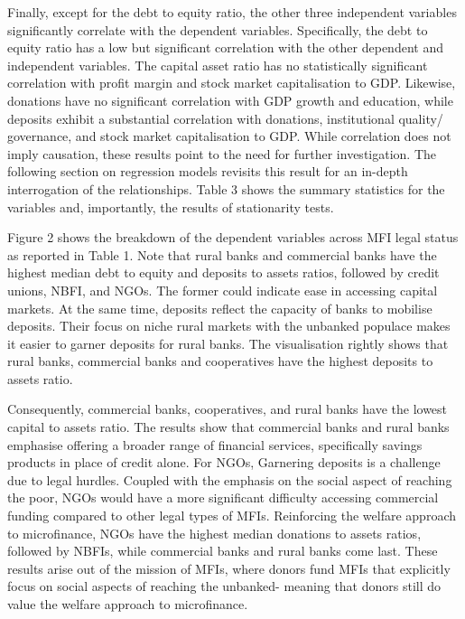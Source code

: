 \documentclass[a4paper,nobind]{templates/ociamthesis}
\begin{document}
Finally, except for the debt to equity ratio, the other three independent variables significantly correlate with the dependent variables. Specifically, the debt to equity ratio has a low but significant correlation with the other dependent and independent variables. The capital asset ratio has no statistically significant correlation with profit margin and stock market capitalisation to GDP. Likewise, donations have no significant correlation with GDP growth and education, while deposits exhibit a substantial correlation with donations, institutional quality/ governance, and stock market capitalisation to GDP. While correlation does not imply causation, these results point to the need for further investigation. The following section on regression models revisits this result for an in-depth interrogation of the relationships. Table 3 shows the summary statistics for the variables and, importantly, the results of stationarity tests.

Figure 2 shows the breakdown of the dependent variables across MFI legal status as reported in Table 1. Note that rural banks and commercial banks have the highest median debt to equity and deposits to assets ratios, followed by credit unions, NBFI, and NGOs. The former could indicate ease in accessing capital markets. At the same time, deposits reflect the capacity of banks to mobilise deposits. Their focus on niche rural markets with the unbanked populace makes it easier to garner deposits for rural banks. The visualisation rightly shows that rural banks, commercial banks and cooperatives have the highest deposits to assets ratio.

Consequently, commercial banks, cooperatives, and rural banks have the lowest capital to assets ratio. The results show that commercial banks and rural banks emphasise offering a broader range of financial services, specifically savings products in place of credit alone. For NGOs, Garnering deposits is a challenge due to legal hurdles. Coupled with the emphasis on the social aspect of reaching the poor, NGOs would have a more significant difficulty accessing commercial funding compared to other legal types of MFIs. Reinforcing the welfare approach to microfinance, NGOs have the highest median donations to assets ratios, followed by NBFIs, while commercial banks and rural banks come last. These results arise out of the mission of MFIs, where donors fund MFIs that explicitly focus on social aspects of reaching the unbanked- meaning that donors still do value the welfare approach to microfinance.
\end{document}
